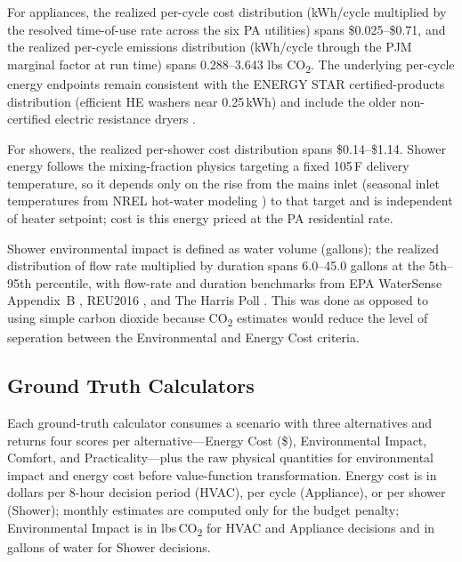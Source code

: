 \documentclass[a4paper,fleqn]{cas-dc}
\begin{document}
For appliances, the realized per-cycle cost distribution (kWh/cycle multiplied by the resolved time-of-use rate across the six PA utilities) spans \$0.025--\$0.71, and the realized per-cycle emissions distribution (kWh/cycle through the PJM marginal factor at run time) spans 0.288--3.643 lbs CO\textsubscript{2}. The underlying per-cycle energy endpoints remain consistent with the ENERGY STAR certified-products distribution (efficient HE washers near 0.25\,kWh) and include the older non-certified electric resistance dryers \citep{energystar_products,chenyu2018,hustvedt2013,neep2015,porras2020}.

For showers, the realized per-shower cost distribution spans \$0.14--\$1.14. Shower energy follows the mixing-fraction physics targeting a fixed 105\,\textdegree{}F delivery temperature, so it depends only on the rise from the mains inlet (seasonal inlet temperatures from NREL hot-water modeling \citep{hendron2008}) to that target and is independent of heater setpoint; cost is this energy priced at the PA residential rate. 

Shower environmental impact is defined as water volume (gallons); the realized distribution of flow rate multiplied by duration spans 6.0--45.0 gallons at the 5th--95th percentile, with flow-rate and duration benchmarks from EPA WaterSense Appendix~B \citep{epawatersense}, REU2016 \citep{reu2016}, and The Harris Poll \citep{harrispoll2024}. This was done as opposed to using simple carbon dioxide because CO\textsubscript{2} estimates would reduce the level of seperation between the Environmental and Energy Cost criteria. 

\subsection{Ground Truth Calculators}
\label{sec:gt-calculators}
Each ground-truth calculator consumes a scenario with three alternatives and returns four scores per alternative---Energy Cost (\$), Environmental Impact, Comfort, and Practicality---plus the raw physical quantities for environmental impact and energy cost before value-function transformation. Energy cost is in dollars per 8-hour decision period (HVAC), per cycle (Appliance), or per shower (Shower); monthly estimates are computed only for the budget penalty; Environmental Impact is in lbs\,CO\textsubscript{2} for HVAC and Appliance decisions and in gallons of water for Shower decisions.
\end{document}
